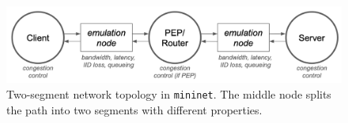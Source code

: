 \begin{figure}[t]
    \centering
    \includegraphics[width=0.7\linewidth]{splitting/figures/mininet-topology.png}
    \caption{Two-segment network topology in \texttt{mininet}. The
     middle node splits the path into two segments with different properties.}
    \label{fig:splitting:mininet}
\end{figure}
